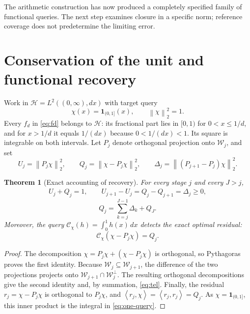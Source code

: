 \documentclass[11pt,a4paper]{article}
\theoremstyle{mine}
\newtheorem{theorem}{Theorem}[section]
\theoremstyle{definition}
\newcommand{\HH}{\mathcal H}
\newcommand{\WW}{\mathcal W}
\newcommand{\norm}[1]{\left\lVert#1\right\rVert}
\newcommand{\inner}[2]{\left\langle#1,#2\right\rangle}
\begin{document}
The arithmetic construction has now produced a completely specified family of functional queries. The next step examines closure in a specific norm; reference coverage does not predetermine the limiting error.

\section{Conservation of the unit and functional recovery}

Work in $\HH=L^2((0,\infty),dx)$ with target query
\begin{equation}\label{eq:target}
\chi(x)=\mathbf1_{(0,1]}(x),\qquad \norm\chi_2^2=1.
\end{equation}
Every $f_d$ in \eqref{eq:fd} belongs to $\HH$: its fractional part lies in $[0,1)$ for $0<x\le1/d$, and for $x>1/d$ it equals $1/(dx)$ because $0<1/(dx)<1$. Its square is integrable on both intervals. Let $P_j$ denote orthogonal projection onto $\WW_j$, and set
\begin{equation}\label{eq:UQ}
U_j=\norm{P_j\chi}_2^2,\qquad Q_j=\norm{\chi-P_j\chi}_2^2,
\qquad\Delta_j=\norm{(P_{j+1}-P_j)\chi}_2^2.
\end{equation}

\begin{theorem}[Exact accounting of recovery]\label{th:conserv}
For every stage $j$ and every $J>j$,
\begin{align}\label{eq:budget}
\boxed{U_j+Q_j=1,}\qquad
\boxed{U_{j+1}-U_j=Q_j-Q_{j+1}=\Delta_j\ge0,}
\end{align}
\begin{equation}\label{eq:tel}
\boxed{\quad Q_j=\sum_{k=j}^{J-1}\Delta_k+Q_J.\quad}
\end{equation}
Moreover, the query $\mathcal C_\chi(h)=\int_0^1h(x)\,dx$ detects the exact optimal residual:
\begin{equation}\label{eq:one-query}
\boxed{\quad \mathcal C_\chi(\chi-P_j\chi)=Q_j.\quad}
\end{equation}
\end{theorem}
\begin{proof}
The decomposition $\chi=P_j\chi+(\chi-P_j\chi)$ is orthogonal, so Pythagoras proves the first identity. Because $\WW_j\subseteq\WW_{j+1}$, the difference of the two projections projects onto $\WW_{j+1}\cap\WW_j^\perp$. The resulting orthogonal decompositions give the second identity and, by summation, \eqref{eq:tel}. Finally, the residual $r_j=\chi-P_j\chi$ is orthogonal to $P_j\chi$, and $\inner{r_j}{\chi}=\inner{r_j}{r_j}=Q_j$. As $\chi=\mathbf1_{(0,1]}$, this inner product is the integral in \eqref{eq:one-query}.
\end{proof}
\end{document}
